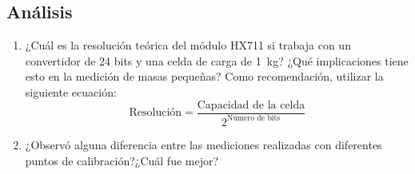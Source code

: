 
\subsection{Análisis}
\begin{enumerate}
    \item ¿Cuál es la resolución teórica del módulo HX711 si trabaja con un convertidor de 24 bits y una celda de carga de \SI{1}{\kilogram}? ¿Qué implicaciones tiene esto en la medición de masas pequeñas? Como recomendación, utilizar la siguiente ecuación:
    \begin{equation*}
        \text{Resolución} = \frac{\text{Capacidad de la celda}}{2^{\text{Número de bits}}}
    \end{equation*} 
    \item ¿Observó alguna diferencia entre las mediciones realizadas con diferentes puntos de calibración?¿Cuál fue mejor?
\end{enumerate}
